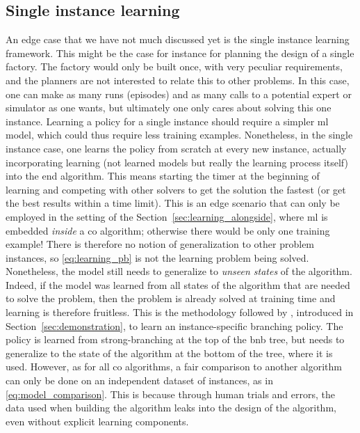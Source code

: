 \documentclass[11pt]{article}
\begin{document}
	\subsection{Single instance learning}
		An edge case that we have not much discussed yet is the single instance learning framework.
		This might be the case for instance for planning the design of a single factory.
		The factory would only be built once, with very peculiar requirements, and the planners are not
		interested to relate this to other problems.
		In this case, one can make as many runs (episodes) and as many calls to a potential expert
		or simulator as one wants, but ultimately one only cares about solving this one instance.
		Learning a policy for a single instance should require a simpler \gls{ml} model, which could thus
		require less training examples.
		Nonetheless, in the single instance case, one learns the policy from scratch at every new instance,
		actually incorporating learning (not learned models but really the learning process itself) into
		the end algorithm.
		This means starting the timer at the beginning of learning and competing with other solvers to get
		the solution the fastest (or get the best results within a time limit).
		This is an edge scenario that can only be employed in the setting of the
		Section~\ref{sec:learning_alongside}, where \gls{ml} is embedded \emph{inside} a \gls{co}
		algorithm; otherwise there would be only one training example!
		There is therefore no notion of generalization to other problem instances, so
		\eqref{eq:learning_pb} is not the learning problem being solved.
		Nonetheless, the model still needs to generalize to \emph{unseen states} of the algorithm.
		Indeed, if the model was learned from all states of the algorithm that are needed to solve the
		problem, then the problem is already solved at training time and learning is therefore fruitless.
		This is the methodology followed by \cite{KhalilLearningbranchmixed2016}, introduced in
		Section~\ref{sec:demonstration}, to learn an instance-specific branching policy.
		The policy is learned from strong-branching at the top of the \gls{bnb} tree, but needs to
		generalize to the state of the algorithm at the bottom of the tree, where it is used.
		However, as for all \gls{co} algorithms, a fair comparison to another algorithm can only be done on
		an independent dataset of instances, as in \eqref{eq:model_comparison}.
		This is because through human trials and errors, the data used when building the algorithm leaks
		into the design of the algorithm, even without explicit learning components.
\end{document}
